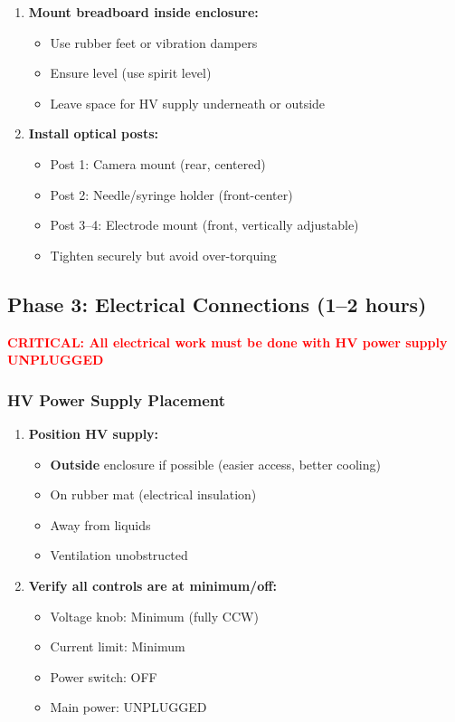 \documentclass[11pt]{article}
\begin{document}
\begin{enumerate}
\item \textbf{Mount breadboard inside enclosure:}
  \begin{itemize}
  \item Use rubber feet or vibration dampers
  \item Ensure level (use spirit level)
  \item Leave space for HV supply underneath or outside
  \end{itemize}

\item \textbf{Install optical posts:}
  \begin{itemize}
  \item Post 1: Camera mount (rear, centered)
  \item Post 2: Needle/syringe holder (front-center)
  \item Post 3--4: Electrode mount (front, vertically adjustable)
  \item Tighten securely but avoid over-torquing
  \end{itemize}
\end{enumerate}

\subsection{Phase 3: Electrical Connections (1--2 hours)}

\begin{center}
\textcolor{red}{\textbf{CRITICAL: All electrical work must be done with HV power supply UNPLUGGED}}
\end{center}

\subsubsection{HV Power Supply Placement}

\begin{enumerate}
\item \textbf{Position HV supply:}
  \begin{itemize}
  \item \textbf{Outside} enclosure if possible (easier access, better cooling)
  \item On rubber mat (electrical insulation)
  \item Away from liquids
  \item Ventilation unobstructed
  \end{itemize}

\item \textbf{Verify all controls are at minimum/off:}
  \begin{itemize}
  \item Voltage knob: Minimum (fully CCW)
  \item Current limit: Minimum
  \item Power switch: OFF
  \item Main power: UNPLUGGED
  \end{itemize}
\end{enumerate}
\end{document}

